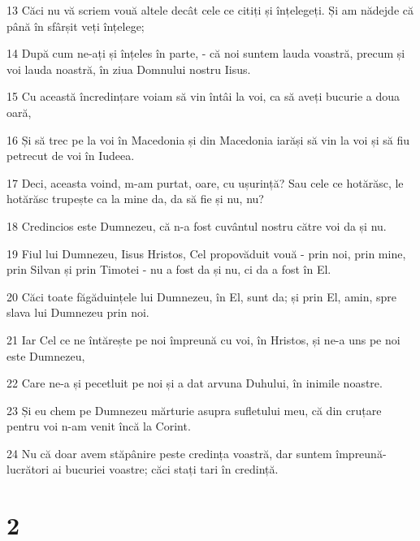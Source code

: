 \par 13 Căci nu vă scriem vouă altele decât cele ce citiți și înțelegeți. Și am nădejde că până în sfârșit veți înțelege;
\par 14 După cum ne-ați și înțeles în parte, - că noi suntem lauda voastră, precum și voi lauda noastră, în ziua Domnului nostru Iisus.
\par 15 Cu această încredințare voiam să vin întâi la voi, ca să aveți bucurie a doua oară,
\par 16 Și să trec pe la voi în Macedonia și din Macedonia iarăși să vin la voi și să fiu petrecut de voi în Iudeea.
\par 17 Deci, aceasta voind, m-am purtat, oare, cu ușurință? Sau cele ce hotărăsc, le hotărăsc trupește ca la mine da, da să fie și nu, nu?
\par 18 Credincios este Dumnezeu, că n-a fost cuvântul nostru către voi da și nu.
\par 19 Fiul lui Dumnezeu, Iisus Hristos, Cel propovăduit vouă - prin noi, prin mine, prin Silvan și prin Timotei - nu a fost da și nu, ci da a fost în El.
\par 20 Căci toate făgăduințele lui Dumnezeu, în El, sunt da; și prin El, amin, spre slava lui Dumnezeu prin noi.
\par 21 Iar Cel ce ne întărește pe noi împreună cu voi, în Hristos, și ne-a uns pe noi este Dumnezeu,
\par 22 Care ne-a și pecetluit pe noi și a dat arvuna Duhului, în inimile noastre.
\par 23 Și eu chem pe Dumnezeu mărturie asupra sufletului meu, că din cruțare pentru voi n-am venit încă la Corint.
\par 24 Nu că doar avem stăpânire peste credința voastră, dar suntem împreună-lucrători ai bucuriei voastre; căci stați tari în credință.

\chapter{2}


